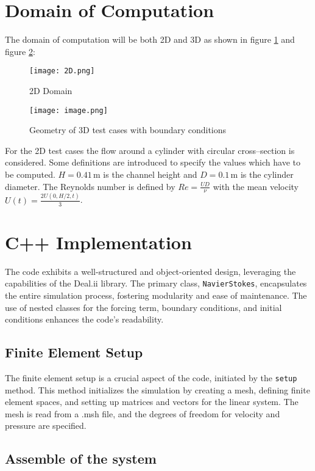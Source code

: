 \documentclass{article}
\begin{document}
\section{Domain of Computation}
The domain of computation will be both 2D and 3D as shown in figure \ref{fig:2D} and figure \ref{fig:3D}:
\begin{figure}
    \centering
    \texttt{[image: 2D.png]}
    \caption{2D Domain}
    \label{fig:2D}
\end{figure}
\begin{figure}[h]
    \centering
    \texttt{[image: image.png]}
    \caption{Geometry of 3D test cases with boundary conditions}
    \label{fig:3D}
\end{figure}
For the 2D test cases the flow around a cylinder with circular cross–section is considered.
Some definitions are introduced to specify the values which have to be computed. $H = 0.41 \, \text{m}$ is the channel height and $D = 0.1 \, \text{m}$ is the cylinder diameter. The Reynolds number is defined by $Re = \frac{UD}{\nu}$ with the mean velocity $U(t) = \frac{2U(0, H/2, t)}{3}$.

\section{C++ Implementation}

The code exhibits a well-structured and object-oriented design, leveraging the capabilities of the Deal.ii library. The primary class, \texttt{NavierStokes}, encapsulates the entire simulation process, fostering modularity and ease of maintenance. The use of nested classes for the forcing term, boundary conditions, and initial conditions enhances the code's readability.

\subsection{Finite Element Setup}

The finite element setup is a crucial aspect of the code, initiated by the \texttt{setup} method. This method initializes the simulation by creating a mesh, defining finite element spaces, and setting up matrices and vectors for the linear system. The mesh is read from a .msh file, and the degrees of freedom for velocity and pressure are specified.

\subsection{Assemble of the system}
\end{document}
